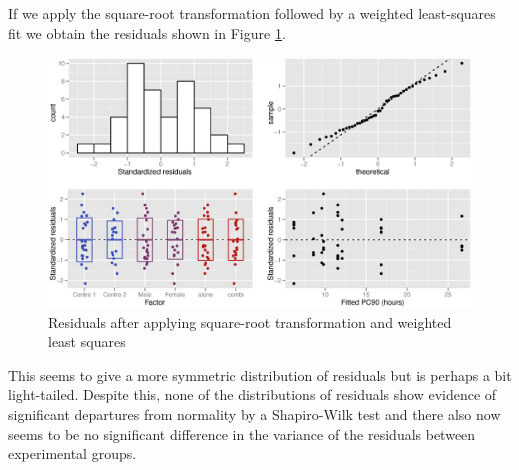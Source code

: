If we apply the square-root transformation followed by a weighted least-squares fit we obtain the residuals shown in Figure \ref{aovsqrtresw}.
\begin{figure}[p]
\includegraphics[width=150mm]{aovsqrtresw.eps} 
\caption{Residuals after applying square-root transformation and weighted least squares}
\label{aovsqrtresw}
\end{figure}
This seems to give a more symmetric distribution of residuals but is perhaps a bit light-tailed.
Despite this, none of the distributions of residuals show evidence of significant departures from normality by a Shapiro-Wilk test and there also now seems to be no significant difference in the variance of the residuals between experimental groups.

